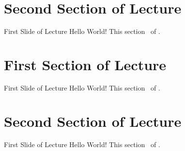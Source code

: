 \documentclass[
	aspectratio=169, %
	8pt, %
]{beamer}
\begin{document}
    \section{Second Section of Lecture \thelecture}

    \begin{frame}{First Slide of Lecture \thelecture}
        Hello World! This section \thesection\ of \insertlecture.
    \end{frame}




    \maketitle

    \contentoverview

    \section{First Section of Lecture \thelecture}

    \begin{frame}{First Slide of Lecture \thelecture}
        Hello World! This section \thesection\ of \insertlecture.
    \end{frame}

    \section{Second Section of Lecture \thelecture}

    \begin{frame}{First Slide of Lecture \thelecture}
        Hello World! This section \thesection\ of \insertlecture.
    \end{frame}
\end{document}
